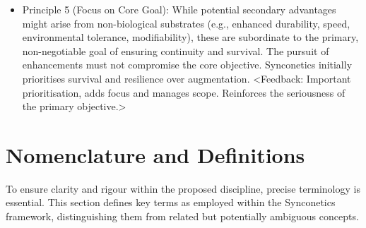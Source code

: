 \documentclass[10pt]{article}
\begin{document}
\begin{sloppypar}
\begin{itemize}
    \item Principle 5 (Focus on Core Goal): While potential secondary advantages might arise from non-biological substrates (e.g., enhanced durability, speed, environmental tolerance, modifiability), these are subordinate to the primary, non-negotiable goal of ensuring continuity and survival. The pursuit of enhancements must not compromise the core objective. Synconetics initially prioritises survival and resilience over augmentation. <Feedback: Important prioritisation, adds focus and manages scope. Reinforces the seriousness of the primary objective.>

  \end{itemize}


  \section{Nomenclature and Definitions}
  \label{sec:nomenclature}

  To ensure clarity and rigour within the proposed discipline, precise terminology is essential. This section defines key terms as employed within the Synconetics framework, distinguishing them from related but potentially ambiguous concepts.


\end{sloppypar}
\end{document}
